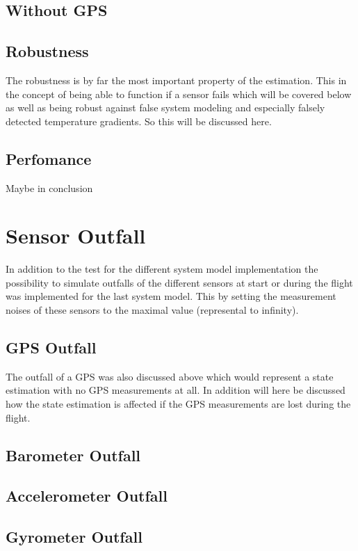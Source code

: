 \subsection{Without GPS}

\subsection{Robustness}
The robustness is by far the most important property of the estimation.
This in the concept of being able to function if a sensor fails which will be covered below as well as being robust against false system modeling 
and especially falsely detected temperature gradients. So this will be discussed here.


\subsection{Perfomance}
Maybe in conclusion

\section{Sensor Outfall}
In addition to the test for the different system model implementation
the possibility to simulate outfalls of the different sensors at start or during the flight was implemented for the last system model.
This by setting the measurement noises of these sensors to the maximal value (represental to infinity).

\subsection{GPS Outfall}
The outfall of a GPS was also discussed above which would represent a state estimation with no GPS measurements at all.
In addition will here be discussed how the state estimation is affected if the GPS measurements are lost during the flight.


\subsection{Barometer Outfall}
\subsection{Accelerometer Outfall}
\subsection{Gyrometer Outfall}